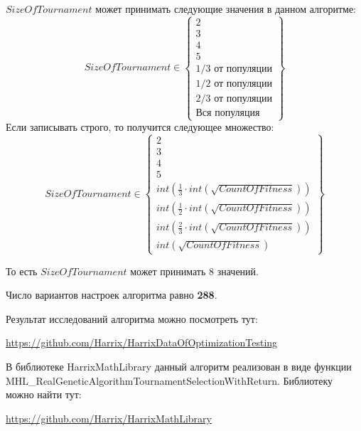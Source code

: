 $SizeOfTournament$ может принимать следующие значения в данном алгоритме:
\begin{equation}
SizeOfTournament \in \begin{Bmatrix}
2\\ 
3\\ 
4\\ 
5\\ 
1/3\text{ от популяции}\\ 
1/2\text{ от популяции}\\ 
2/3\text{ от популяции}\\ 
\text{Вся популяция} 
\end{Bmatrix}
\end{equation}
Если записывать строго, то получится следующее множество:
\begin{equation}
SizeOfTournament \in \begin{Bmatrix}
2\\ 
3\\ 
4\\ 
5\\ 
int\left( \frac{1}{3}\cdot int\left( \sqrt{CountOfFitness}\right)\right)  \\ 
int\left( \frac{1}{2}\cdot int\left( \sqrt{CountOfFitness}\right)\right)\\ 
int\left( \frac{2}{3}\cdot int\left( \sqrt{CountOfFitness}\right)\right)\\ 
int\left( \sqrt{CountOfFitness}\right)
\end{Bmatrix}
\end{equation}

То есть $SizeOfTournament$ может принимать $ 8 $ значений.

Число вариантов настроек алгоритма равно \textbf{288}.

Результат исследований алгоритма можно посмотреть тут:

\href{https://github.com/Harrix/HarrixDataOfOptimizationTesting}{https://github.com/Harrix/HarrixDataOfOptimizationTesting}

В библиотеке HarrixMathLibrary данный алгоритм реализован в виде функции MHL\_RealGeneticAlgorithmTournamentSelectionWithReturn. Библиотеку можно найти тут:

\href{https://github.com/Harrix/HarrixMathLibrary}{https://github.com/Harrix/HarrixMathLibrary}